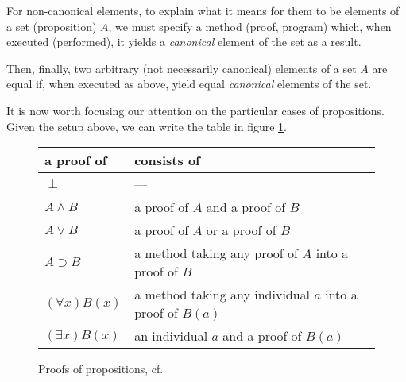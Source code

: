 For non-canonical elements, to explain what it means for them to be elements
of a set (proposition) $ A $, we must specify a method (proof, program) which,
when executed (performed), it yields a \emph{canonical} element of the set as a
result.

Then, finally, two arbitrary (not necessarily canonical) elements of
a set $ A $ are equal if, when executed as above, yield equal
\emph{canonical} elements of the set.

\vspace{0.3cm}

It is now worth focusing our attention on the particular cases of propositions.
Given the setup above, we can write the table in figure \ref{fig:proofs}.

\begin{figure}[!htb]
  \centering
  \begin{tabular}{l|l}
    a proof of & consists of \\
    \hline
    $ \perp $ & --- \\
    $ A \land B $ & a proof of $ A $ and a proof of $ B$ \\
    $ A \lor B $ & a proof of $ A $ or a proof of $ B $ \\
    $ A \supset B $ & a method taking any proof of $ A $ into a proof of $ B $ \\
    $ (\forall x) B(x) $ & a method taking any individual $ a $ into a proof of $ B(a) $ \\
    $ (\exists x)B(x) $ & an individual $ a $ and a proof of $ B(a) $
  \end{tabular}
  \caption{Proofs of propositions, cf.\ \cite[p.\ 7]{mltt}}
  \label{fig:proofs}
\end{figure}

